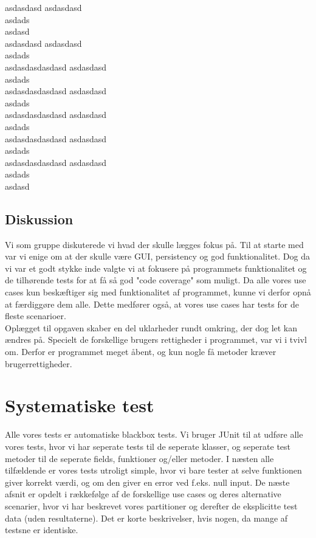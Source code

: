 \documentclass[a4paper,12pt]{article}
\begin{document}
asdasdasd
asdasdasd\\asdads\\asdasd\\
asdasdasd
asdasdasd\\asdads\\asdasdasdasdasd
asdasdasd\\asdads\\asdasdasdasdasd
asdasdasd\\asdads\\asdasdasdasdasd
asdasdasd\\asdads\\asdasdasdasdasd
asdasdasd\\asdads\\asdasdasdasdasd
asdasdasd\\asdads\\asdasd
\newpage
\subsection{Diskussion}
Vi som gruppe diskuterede vi hvad der skulle lægges fokus på. Til at starte med var vi enige om at der skulle være GUI, persistency og god funktionalitet. Dog da vi var et godt stykke inde valgte vi at fokusere på programmets funktionalitet og de tilhørende tests for at få så god "code coverage" som muligt. Da alle vores use cases kun beskæftiger sig med funktionalitet af programmet, kunne vi derfor opnå at færdiggøre dem alle. Dette medfører også, at vores use cases har tests for de fleste scenarioer.\\
Oplægget til opgaven skaber en del uklarheder rundt omkring, der dog let kan ændres på. Specielt de forskellige brugers rettigheder i programmet, var vi i tvivl om. Derfor er programmet meget åbent, og kun nogle få metoder kræver brugerrettigheder. 
\section{Systematiske test}
Alle vores tests er automatiske blackbox tests. Vi bruger JUnit til at udføre alle vores tests, hvor vi har seperate tests til de seperate klasser, og seperate test metoder til de seperate fields, funktioner og/eller metoder. I næsten alle tilfældende er vores tests utroligt simple, hvor vi bare tester at selve funktionen giver korrekt værdi, og om den giver en error ved f.eks. null input. De næste afsnit er opdelt i rækkefølge af de forskellige use cases og deres alternative scenarier, hvor vi har beskrevet vores partitioner og derefter de eksplicitte test data (uden resultaterne). Det er korte beskrivelser, hvis nogen, da mange af testsne er identiske.
\end{document}

